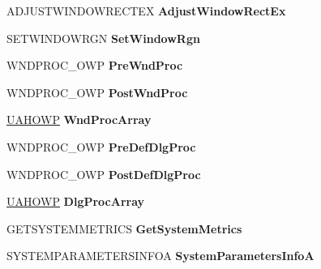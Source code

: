 \begin{DoxyCompactItemize}
A\+D\+J\+U\+S\+T\+W\+I\+N\+D\+O\+W\+R\+E\+C\+T\+EX {\bfseries Adjust\+Window\+Rect\+Ex}
\item 
\mbox{\label{structtag_u_s_e_r_a_p_i_h_o_o_k_a3e53cc7824640ed9d5e67be17efcc425}} 
S\+E\+T\+W\+I\+N\+D\+O\+W\+R\+GN {\bfseries Set\+Window\+Rgn}
\item 
\mbox{\label{structtag_u_s_e_r_a_p_i_h_o_o_k_a522c882322fa88c9d1214222e0f8128e}} 
W\+N\+D\+P\+R\+O\+C\+\_\+\+O\+WP {\bfseries Pre\+Wnd\+Proc}
\item 
\mbox{\label{structtag_u_s_e_r_a_p_i_h_o_o_k_a0975fc595d59a98f22673003e99bc3e1}} 
W\+N\+D\+P\+R\+O\+C\+\_\+\+O\+WP {\bfseries Post\+Wnd\+Proc}
\item 
\mbox{\label{structtag_u_s_e_r_a_p_i_h_o_o_k_a5578c2671054b2740027a508fa551803}} 
\hyperlink{struct___u_a_h_o_w_p}{U\+A\+H\+O\+WP} {\bfseries Wnd\+Proc\+Array}
\item 
\mbox{\label{structtag_u_s_e_r_a_p_i_h_o_o_k_ac3e30d67b5211d9f6681a2a94edd0b2a}} 
W\+N\+D\+P\+R\+O\+C\+\_\+\+O\+WP {\bfseries Pre\+Def\+Dlg\+Proc}
\item 
\mbox{\label{structtag_u_s_e_r_a_p_i_h_o_o_k_ace6c19f1cff0745ed7fa51dd5a7676a1}} 
W\+N\+D\+P\+R\+O\+C\+\_\+\+O\+WP {\bfseries Post\+Def\+Dlg\+Proc}
\item 
\mbox{\label{structtag_u_s_e_r_a_p_i_h_o_o_k_aa56cae25ef0c209ed017eeeb20c9610c}} 
\hyperlink{struct___u_a_h_o_w_p}{U\+A\+H\+O\+WP} {\bfseries Dlg\+Proc\+Array}
\item 
\mbox{\label{structtag_u_s_e_r_a_p_i_h_o_o_k_a7acba5667791136005a46daea3d76e4f}} 
G\+E\+T\+S\+Y\+S\+T\+E\+M\+M\+E\+T\+R\+I\+CS {\bfseries Get\+System\+Metrics}
\item 
\mbox{\label{structtag_u_s_e_r_a_p_i_h_o_o_k_a01e99a2e686938055bc6424ddb662252}} 
S\+Y\+S\+T\+E\+M\+P\+A\+R\+A\+M\+E\+T\+E\+R\+S\+I\+N\+F\+OA {\bfseries System\+Parameters\+InfoA}

\end{DoxyCompactItemize}
